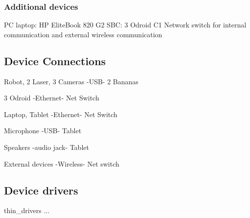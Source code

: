 \subsubsection{Additional devices}
PC laptop: HP EliteBook 820 G2
SBC: 3 Odroid C1
Network switch for internal communication and external wireless communication




\subsection{Device Connections}

Robot, 2 Laser, 3 Cameras -USB- 2 Bananas

3 Odroid  -Ethernet- Net Switch

Laptop, Tablet -Ethernet- Net Switch

Microphone -USB- Tablet

Speakers -audio jack- Tablet

External devices -Wireless- Net switch



\subsection{Device drivers}

thin\_drivers ...






